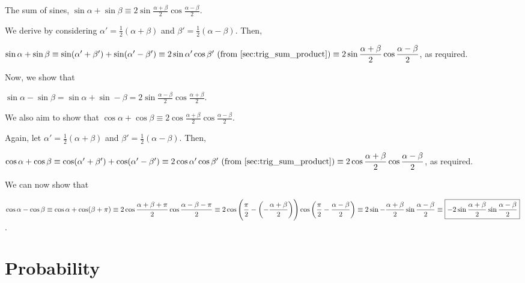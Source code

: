 \documentclass[a4paper,11pt]{article}
\begin{document}

    The sum of sines, $\displaystyle \boxed{\sin \alpha + \sin \beta \equiv
        2 \sin \frac{\alpha + \beta}2 \cos \frac{\alpha - \beta}2}$.

    We derive by considering $\alpha' = \frac 12 (\alpha + \beta)$ and
    $\beta' = \frac 12 (\alpha - \beta)$. Then,

    $\sin \alpha + \sin \beta \equiv
     \sin(\alpha' + \beta') + \sin(\alpha' - \beta') \equiv
     2\sin \alpha' \cos \beta'\ \text{(from \ref{sec:trig_sum_product})}
     \\\\\equiv
    \displaystyle
        2 \sin \frac{\alpha + \beta}2 \cos \frac{\alpha - \beta}2$, as required.

    Now, we show that

    $\displaystyle \boxed{\sin \alpha - \sin \beta =
        \sin \alpha + \sin -\beta =
        2 \sin \frac{\alpha - \beta} 2 \cos\frac{\alpha + \beta} 2}$.

    We also aim to show that
    $\displaystyle \boxed{\cos \alpha + \cos \beta \equiv
        2 \cos\frac{\alpha + \beta} 2 \cos \frac{\alpha - \beta} 2}$.

    Again, let $\alpha' = \frac 12 (\alpha + \beta)$ and
    $\beta' = \frac 12 (\alpha - \beta)$. Then,

    $\cos \alpha + \cos \beta \equiv
     \cos(\alpha' + \beta') + \cos(\alpha' - \beta') \equiv
     2\cos \alpha' \cos \beta'\ \text{(from \ref{sec:trig_sum_product})}
     \\\\\equiv
     \displaystyle
        2 \cos\frac{\alpha + \beta} 2 \cos \frac{\alpha - \beta} 2$,
    as required.

    We can now show that

    $\displaystyle \cos \alpha - \cos \beta \equiv
     \cos \alpha + \cos (\beta + \pi)  \equiv
     2 \cos \frac{\alpha + \beta + \pi} 2 \cos \frac {\alpha - \beta - \pi} 2
     \\\equiv
     2 \cos \left(\frac \pi 2 - \left(-\frac{\alpha + \beta} 2\right)\right)
       \cos \left(\frac \pi 2 - \frac{\alpha - \beta} 2 \right) \equiv
     2 \sin -\frac{\alpha + \beta} 2 \sin \frac{\alpha - \beta} 2 \\\\\equiv
     \boxed{-2 \sin \frac{\alpha + \beta} 2 \sin \frac{\alpha - \beta} 2}$.

    \section{Probability}
\end{document}
